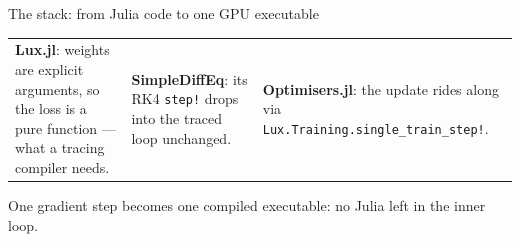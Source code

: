 \documentclass[aspectratio=169]{beamer}
\begin{document}
\begin{frame}{The stack: from Julia code to one GPU executable}
  \vspace{0.4em}
  {\footnotesize
  \begin{tabular}{@{}>{\raggedright\arraybackslash}p{}>{\raggedright\arraybackslash}p{}>{\raggedright\arraybackslash}p{}@{}}
    \textbf{Lux.jl}: weights are explicit arguments, so the loss is a pure function
    --- what a tracing compiler needs. &
    \textbf{SimpleDiffEq}: its RK4 \texttt{step!} drops into the traced loop unchanged. &
    \textbf{Optimisers.jl}: the update rides along via
    \texttt{Lux.Training.single\_train\_step!}. \\
  \end{tabular}}

  \vspace{0.4em}
  \alert{One gradient step becomes one compiled executable: no Julia left in the inner loop.}
\end{frame}
\end{document}
